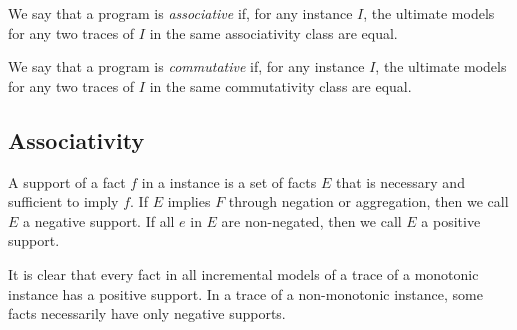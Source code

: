 \begin{definition}
%
We say that a \lang program is {\em associative} if, for any instance $I$,  the
ultimate models for any two traces of $I$ in the same associativity class are
equal.
%
\end{definition}

\begin{definition}
%
We say that a \lang program is {\em commutative} if, for any instance $I$, the
ultimate models for any two traces of $I$ in the same commutativity class are
equal.
%
\end{definition}

\subsection{Associativity}

%
%

\begin{definition}
%
A support of a fact $f$ in a \lang instance is a set of facts $E$ that is
necessary and sufficient to imply $f$.  If $E$ implies $F$ through negation or
aggregation, then we call $E$ a negative support.  If all $e$ in $E$ are
non-negated, then we call $E$ a positive support.
%
\end{definition}

It is clear that every fact in all incremental models of a trace of a monotonic
\lang instance has a positive support.  In a trace of a non-monotonic \lang
instance, some facts necessarily have only negative supports.

